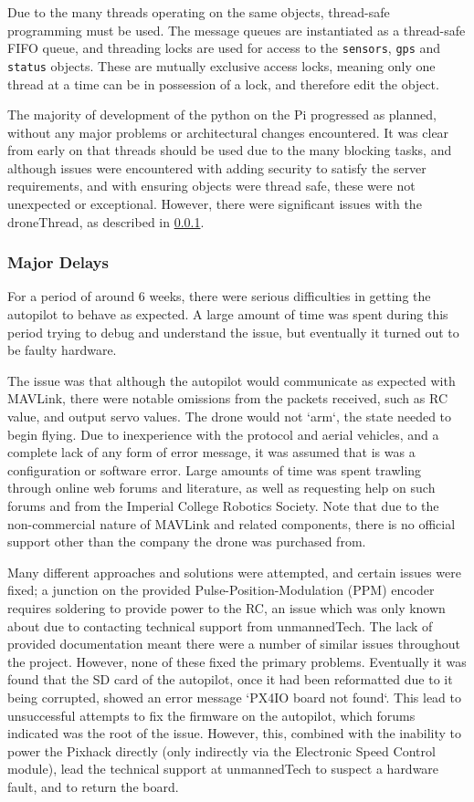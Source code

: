 \documentclass{article}
\begin{document}
Due to the many threads operating on the same objects, thread-safe programming must be used. The message queues are instantiated as a thread-safe FIFO queue, and threading locks are used for access to the \texttt{sensors}, \texttt{gps} and \texttt{status} objects. These are mutually exclusive access locks, meaning only one thread at a time can be in possession of a lock, and therefore edit the object.

The majority of development of the python on the Pi progressed as planned, without any major problems or architectural changes encountered. It was clear from early on that threads should be used due to the many blocking tasks, and although issues were encountered with adding security to satisfy the server requirements, and with ensuring objects were thread safe, these were not unexpected or exceptional. However, there were significant issues with the droneThread, as described in \ref{MajorDelays}.

\subsubsection{Major Delays} \label{MajorDelays}
For a period of around 6 weeks, there were serious difficulties in getting the autopilot to behave as expected. A large amount of time was spent during this period trying to debug and understand the issue, but eventually it turned out to be faulty hardware. 

The issue was that although the autopilot would communicate as expected with MAVLink, there were notable omissions from the packets received, such as RC value, and output servo values. The drone would not `arm`, the state needed to begin flying. Due to inexperience with the protocol and aerial vehicles, and a complete lack of any form of error message, it was assumed that is was a configuration or software error. Large amounts of time was spent trawling through online web forums and literature, as well as requesting help on such forums and from the Imperial College Robotics Society. Note that due to the non-commercial nature of MAVLink and related components, there is no official support other than the company the drone was purchased from. 

Many different approaches and solutions were attempted, and certain issues were fixed; a junction on the provided Pulse-Position-Modulation (PPM) encoder requires soldering to provide power to the RC, an issue which was only known about due to contacting technical support from unmannedTech\cite{ppmSolder}. The lack of provided documentation meant there were a number of similar issues throughout the project. However, none of these fixed the primary problems. Eventually it was found that the SD card of the autopilot, once it had been reformatted due to it being corrupted, showed an error message `PX4IO board not found`. This lead to unsuccessful attempts to fix the firmware on the autopilot, which forums indicated was the root of the issue. However, this, combined with the inability to power the Pixhack directly (only indirectly via the Electronic Speed Control module), lead the technical support at unmannedTech to suspect a hardware fault, and to return the board\cite{px4ioNotFound}. 
\end{document}

